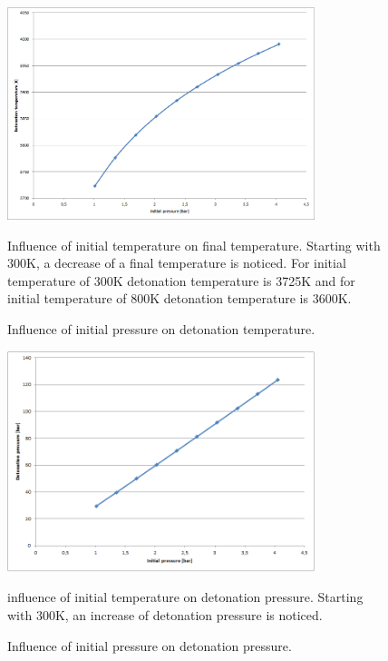 \documentclass[11pt]{article}
\begin{document}
 \begin{figure} [H]
	\begin{center}
    	\includegraphics[width=0.8\textwidth]{fpress_temp}
        \caption{Influence of initial pressure on detonation temperature.}
    \end{center}
\normalsize
{Influence of initial temperature on final temperature. Starting with 300K, a decrease of a final temperature is noticed. For initial temperature of 300K detonation temperature is 3725K and for initial temperature of 800K detonation temperature is 3600K.}
\end{figure}

 \begin{figure} [H]
	\begin{center}
    	\includegraphics[width=0.8\textwidth]{fpress_press}
        \caption{Influence of initial pressure on detonation pressure.}
    \end{center}
\normalsize
{influence of initial temperature on detonation pressure. Starting with 300K, an increase of detonation pressure is noticed. }
\end{figure}
\end{document}
